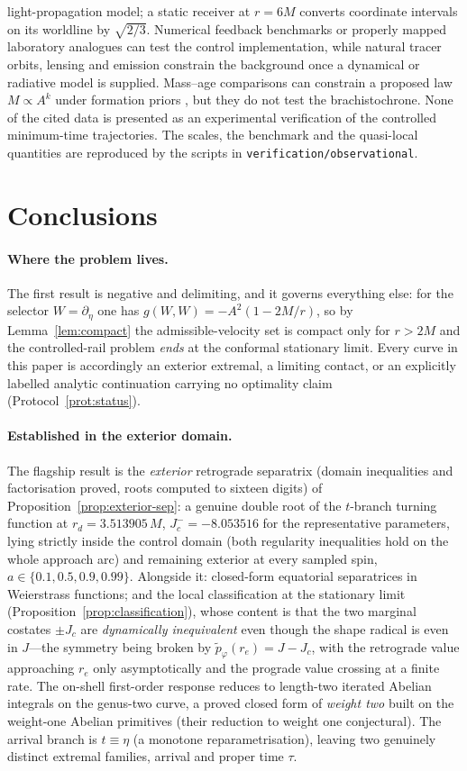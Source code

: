 \documentclass[12pt]{iopart}
\theoremstyle{plain}
\theoremstyle{definition}
\theoremstyle{remark}
\newcommand{\re}{r_{e}}
\newcommand{\Jc}{J_{c}}
\begin{document}
light-propagation model; a static receiver at $r=6M$ converts coordinate
intervals on its worldline by $\sqrt{2/3}$. Numerical feedback benchmarks or
properly mapped laboratory analogues can test the control implementation,
while natural tracer orbits, lensing and emission constrain the background once a
dynamical or radiative model is supplied. Mass--age comparisons can constrain a
proposed law $M\propto A^k$ under formation priors \cite{AndraeElBadry2023,Cadoni2023},
but they do not test the brachistochrone. None of the cited data is presented as
an experimental verification of the controlled minimum-time trajectories. The
scales, the benchmark and the quasi-local quantities are reproduced by the
scripts in \texttt{verification/observational}.

\section{Conclusions}
\label{sec:concl-II}
\paragraph{Where the problem lives.} The first result is negative and delimiting, and it
governs everything else: for the selector $W=\partial_\eta$ one has
$g(W,W)=-A^2(1-2M/r)$, so by Lemma~\ref{lem:compact} the admissible-velocity set is
compact only for $r>2M$ and the controlled-rail problem \emph{ends} at the conformal
stationary limit. Every curve in this paper is accordingly an exterior extremal, a
limiting contact, or an explicitly labelled analytic continuation carrying no optimality
claim (Protocol~\ref{prot:status}).

\paragraph{Established in the exterior domain.} The flagship result is the
\emph{exterior} retrograde separatrix (domain inequalities and factorisation proved, roots
computed to sixteen digits) of Proposition~\ref{prop:exterior-sep}: a genuine
double root of the $t$-branch turning function at
$r_d=3.513905\,M$, $J_c^{-}=-8.053516$ for the representative parameters, lying strictly
inside the control domain (both regularity inequalities hold on the whole approach arc)
and remaining exterior at every sampled spin, $a\in\{0.1,0.5,0.9,0.99\}$. Alongside it: closed-form
equatorial separatrices in Weierstrass functions; and the local classification at
the stationary limit (Proposition~\ref{prop:classification}), whose content is that the two
marginal costates $\pm\Jc$ are \emph{dynamically inequivalent} even though the shape
radical is even in $J$---the symmetry being broken by $\tilde p_\varphi(\re)=J-\Jc$, with
the retrograde value approaching $\re$ only asymptotically and the prograde value crossing
at a finite rate. The on-shell first-order response reduces to length-two iterated Abelian
integrals on the genus-two curve, a proved closed form of \emph{weight two} built on the
weight-one Abelian primitives (their reduction to weight one conjectural). The arrival
branch is $t\equiv\eta$ (a monotone reparametrisation), leaving two genuinely distinct
extremal families, arrival and proper time $\tau$.
\end{document}
